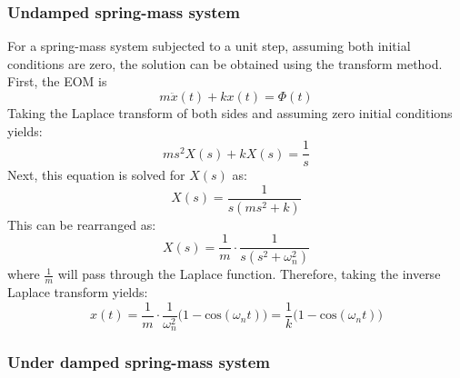 \documentclass[12pt,letter]{article}
\numberwithin{ex}{section} %
\numberwithin{re}{section} %
\begin{document}
\subsubsection{Undamped spring-mass system}

For a spring-mass system subjected to a unit step, assuming both initial conditions are zero, the solution can be obtained using the transform method. First, the EOM is 
\begin{equation}
m\ddot{x}(t) + kx(t) = \Phi(t)
\end{equation}
Taking the Laplace transform of both sides and assuming zero initial conditions yields:
\begin{equation}
	ms^2X(s)+kX(s) =\frac{1}{s}
\end{equation}
Next, this equation is solved for $X(s)$ as:
\begin{equation}
	X(s) = \frac{1}{s(ms^2+k)}
\end{equation}
This can be rearranged as:
\begin{equation}
	X(s) = \frac{1}{m} \cdot \frac{1}{s(s^2+\omega_n^2)}
\end{equation}
where $\frac{1}{m}$ will pass through the Laplace function. Therefore, taking the inverse Laplace transform yields:
\begin{equation}
	x(t) = \frac{1}{m} \cdot \frac{1}{\omega_n^2}\big(1-\text{cos}(\omega_n t)\big) = \frac{1}{k}\big(1-\text{cos}(\omega_n t)\big)
\end{equation}
 
\subsubsection{Under damped spring-mass system}
\end{document}
